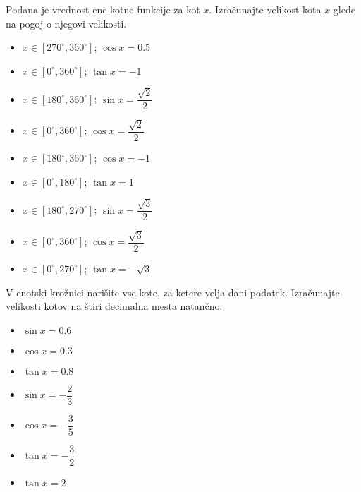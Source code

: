         

  
        
            \begin{naloga}
                Podana je vrednost ene kotne funkcije za kot $x$. 
                Izračunajte velikost kota $x$ glede na pogoj o njegovi velikosti.
                \begin{multicols}{2}
                \begin{itemize}
                            \item $x\in[270^\circ,360^\circ]$; $\cos{x}=0.5 $ 
                            \item $x\in[0^\circ,360^\circ]$; $\tan{x}=-1$ 
                            \item $x\in[180^\circ,360^\circ]$; $\sin{x}=\dfrac{\sqrt{2}}{2}$ 
                            \item $x\in[0^\circ,360^\circ]$; $\cos{x}=\dfrac{\sqrt{2}}{2}$ 
                            \item $x\in[180^\circ,360^\circ]$; $\cos{x}=-1$ 
                            \item $x\in[0^\circ,180^\circ]$; $\tan{x}=1$ 
                            \item $x\in[180^\circ,270^\circ]$; $\sin{x}=\dfrac{\sqrt{3}}{2}$ 
                            \item $x\in[0^\circ,360^\circ]$; $\cos{x}=\dfrac{\sqrt{3}}{2}$ 
                            \item $x\in[0^\circ,270^\circ]$; $\tan{x}=-\sqrt{3}$ 
                \end{itemize}
            \end{multicols}
            \end{naloga}

        


        
            \begin{naloga}
                V enotski krožnici narišite vse kote, za ketere velja dani podatek.
                Izračunajte velikosti kotov na štiri decimalna mesta natančno.
                \begin{multicols}{3}
                \begin{itemize}
                            \item $\sin{x}=0.6 $ 
                            \item $\cos{x}=0.3 $ 
                            \item $\tan{x}=0.8 $ 
                            \item $\sin{x}=-\dfrac{2}{3} $ 
                            \item $\cos{x}=-\dfrac{3}{5} $ 
                            \item $\tan{x}=-\dfrac{3}{2} $ 
                            \item $\tan{x}=2 $ 
                \end{itemize}
            \end{multicols}
            \end{naloga}

